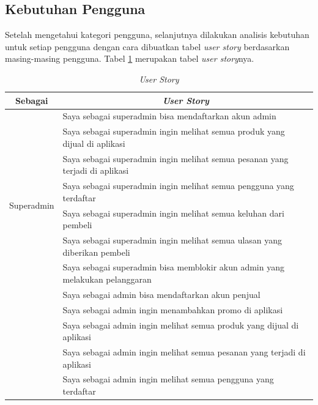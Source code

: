 \subsection{Kebutuhan Pengguna}
Setelah mengetahui kategori pengguna, selanjutnya dilakukan analisis kebutuhan untuk setiap pengguna dengan cara dibuatkan tabel \textit{user story} berdasarkan masing-masing pengguna. Tabel \ref*{tab:user story} merupakan tabel \textit{user story}nya.

\begin{table}[H]
	\begin{center}
	\caption{\textit{User Story}}
	\label{tab:user story}
	\begin{tabular}{|c| m{12cm} |}
	\hline
	{\footnotesize Sebagai} & \multicolumn{1}{c|}{{\footnotesize \textit{User Story}}}\\
	\hline
	\multirow{8}{*}{\footnotesize Superadmin} & {\footnotesize Saya sebagai superadmin bisa mendaftarkan akun admin}\\
	\cline{2-2}& {\footnotesize Saya sebagai superadmin ingin melihat semua produk yang dijual di aplikasi}\\
	\cline{2-2}& {\footnotesize Saya sebagai superadmin ingin melihat semua pesanan yang terjadi di aplikasi}\\
	\cline{2-2}& {\footnotesize Saya sebagai superadmin ingin melihat semua pengguna yang terdaftar}\\
	\cline{2-2}& {\footnotesize Saya sebagai superadmin ingin melihat semua keluhan dari pembeli}\\
	\cline{2-2}& {\footnotesize Saya sebagai superadmin ingin melihat semua ulasan yang diberikan pembeli}\\
	\cline{2-2}& {\footnotesize Saya sebagai superadmin bisa memblokir akun admin yang melakukan pelanggaran}\\
	\hline
	\multirow{8}{*}{\footnotesize Admin} & {\footnotesize Saya sebagai admin bisa mendaftarkan akun penjual}\\
	\cline{2-2}& {\footnotesize Saya sebagai admin ingin menambahkan promo di aplikasi}\\
	\cline{2-2}& {\footnotesize Saya sebagai admin ingin melihat semua produk yang dijual di aplikasi}\\
	\cline{2-2}& {\footnotesize Saya sebagai admin ingin melihat semua pesanan yang terjadi di aplikasi}\\
	\cline{2-2}& {\footnotesize Saya sebagai admin ingin melihat semua pengguna yang terdaftar}\\

\end{tabular}
\end{center}
\end{table}
